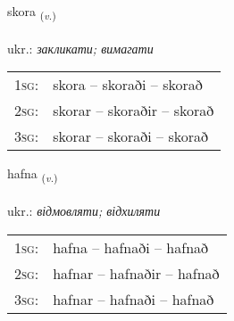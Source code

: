 \documentclass[frontgrid, backgrid]{flacards}\usepackage[]{graphicx}\usepackage[]{xcolor}
\begin{document}
\renewcommand{\flhead}{\vskip5pt \fboxsep=0pt {\small\bfseries\footnotesize Sagnorð | дієслово}}
\renewcommand{\fcfoot}{\vskip5pt \fboxsep=0pt \hspace{2pt}{\small\bfseries\footnotesize 1K}}

\renewcommand{\blhead}{\vskip5pt {\small\bfseries\footnotesize Sagnorð | дієслово }}
\renewcommand{\bcfoot}{\vskip5pt \hspace{2pt}{\small\bfseries\footnotesize 1K}}


{skora \small{\textsubscript{(\textit{v.})}} \\[1ex] %
\textphonetic{[skɔːra]} \\
ukr.: \emph{закликати; вимагати} \\  [2ex]
\renewcommand*{\arraystretch}{0.8}
\begin{tabular}{p{1cm}l}
\textsc{1sg}: & skora -- skoraði -- skorað \\ 
\textsc{2sg}: & skorar -- skoraðir -- skorað \\ 
\textsc{3sg}: & skorar -- skoraði -- skorað \\ 
\end{tabular}
}

\renewcommand{\flhead}{\vskip5pt \fboxsep=0pt {\small\bfseries\footnotesize Lýsingarorð | дієслово}}
\renewcommand{\fcfoot}{\vskip5pt \fboxsep=0pt \hspace{2pt}{\small\bfseries\footnotesize 1K}}

\renewcommand{\blhead}{\vskip5pt {\small\bfseries\footnotesize Lýsingarorð | дієслово }}
\renewcommand{\bcfoot}{\vskip5pt \hspace{2pt}{\small\bfseries\footnotesize 1K}}


{hafna \small{\textsubscript{(\textit{v.})}} \\[1ex] %
\textphonetic{[hapna]} \\
ukr.: \emph{відмовляти; відхиляти} \\  [2ex]
\renewcommand*{\arraystretch}{0.8}
\begin{tabular}{p{1cm}l}
\textsc{1sg}: & hafna -- hafnaði -- hafnað \\ 
\textsc{2sg}: & hafnar -- hafnaðir -- hafnað \\ 
\textsc{3sg}: & hafnar -- hafnaði -- hafnað \\ 
\end{tabular}
}
\end{document}
